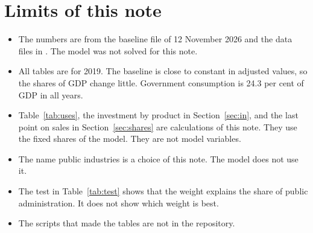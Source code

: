 \documentclass[11pt,a4paper]{article}
\newcommand{\code}[1]{\texttt{\detokenize{#1}}}
\begin{document}
\section{Limits of this note}

\begin{itemize}
\item The numbers are from the baseline file of 12 November 2026 and the data files in \code{model_julia/data}. The model was not solved for this note.
\item All tables are for 2019. The baseline is close to constant in adjusted values, so the shares of GDP change little. Government consumption is 24.3 per cent of GDP in all years.
\item Table~\ref{tab:uses}, the investment by product in Section~\ref{sec:in}, and the last point on sales in Section~\ref{sec:shares} are calculations of this note. They use the fixed shares of the model. They are not model variables.
\item The name public industries is a choice of this note. The model does not use it.
\item The test in Table~\ref{tab:test} shows that the weight explains the share of public administration. It does not show which weight is best.
\item The scripts that made the tables are not in the repository.
\end{itemize}
\end{document}
